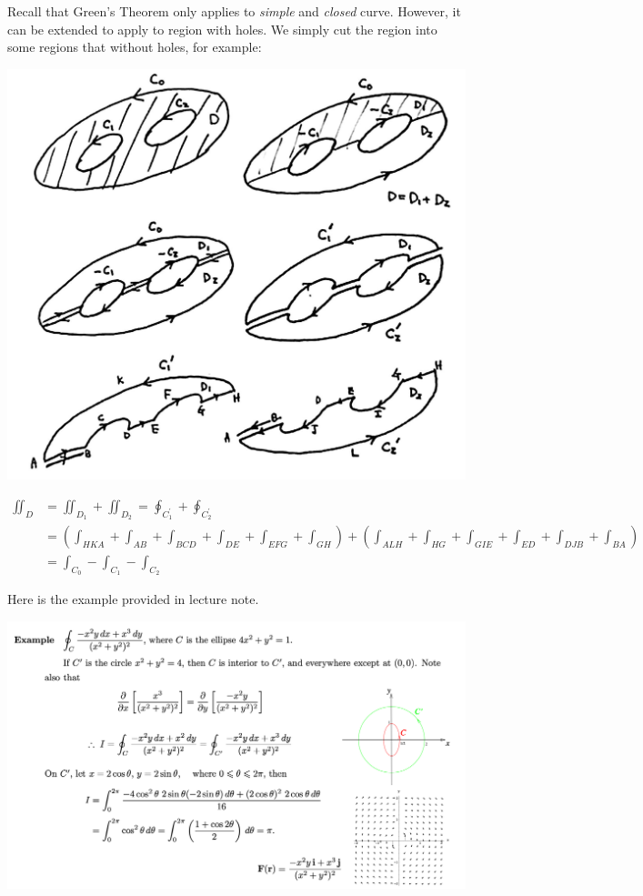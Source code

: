 \begin{spacing}{1.3}
    {}

    Recall that Green's Theorem only applies to {\it simple} and {\it closed} curve. 
    However, it can be extended to apply to region with holes. We simply cut the region 
    into some regions that without holes, for example:
    \begin{center}
        \includegraphics[scale=0.23]{images/Ch16-general-green.JPG}
    \end{center}
    \begin{align*}
        \iint_D &= \iint_{D_1}+\iint_{D_2} = \oint_{C_1^\prime}+\oint_{C_2^\prime}\\
        &= \left( \int_{HKA}+\int_{AB}+\int_{BCD}+\int_{DE}+\int_{EFG}+\int_{GH} \right)
        + \left( \int_{ALH}+\int_{HG}+\int_{GIE}+\int_{ED}+\int_{DJB}+\int_{BA} \right)\\
        &= \int_{C_0}-\int_{C_1}-\int_{C_2}
    \end{align*}



    \newpage
    {\blue Here is the example provided in lecture note.}
    
    \includegraphics[scale=0.44]{images/Ch16-general-green-eg.png}




\end{spacing}
